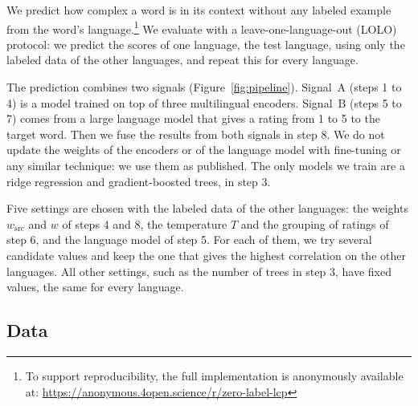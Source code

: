\documentclass[11pt]{article}
\begin{document}


We predict how complex a word is in its context without any labeled example from the word's
language.\footnote{To support reproducibility, the full implementation is anonymously available at: \url{https://anonymous.4open.science/r/zero-label-lcp}} We evaluate with a leave-one-language-out (LOLO) protocol: we predict the scores of one %
language, the test language, using only the labeled data of the other languages, and repeat this
for every language.

The prediction combines two signals (Figure~\ref{fig:pipeline}). Signal~A (steps 1 to 4) is a model
trained on top of three multilingual encoders. Signal~B (steps 5 to 7) comes from a large language
model that gives a rating from 1 to 5 to the target word. Then we fuse the results from both signals
in step 8. We do not update the weights of the encoders or of the language model with fine-tuning or %
any similar technique: we use them as published. The only models we train are a ridge regression
and gradient-boosted trees, in step 3.

Five settings are chosen with the labeled data of the other languages: the weights $w_{\mathrm{src}}$ %
and $w$ of steps 4 and 8, the temperature $T$ and the grouping of ratings of step 6, and the language
model of step 5. For each of them, we try several candidate values and keep the one that gives the
highest correlation on the other languages. All other settings, such as the number of trees in
step 3, have fixed values, the same for every language.

\subsection{Data}
\label{sec:data}
\end{document}
